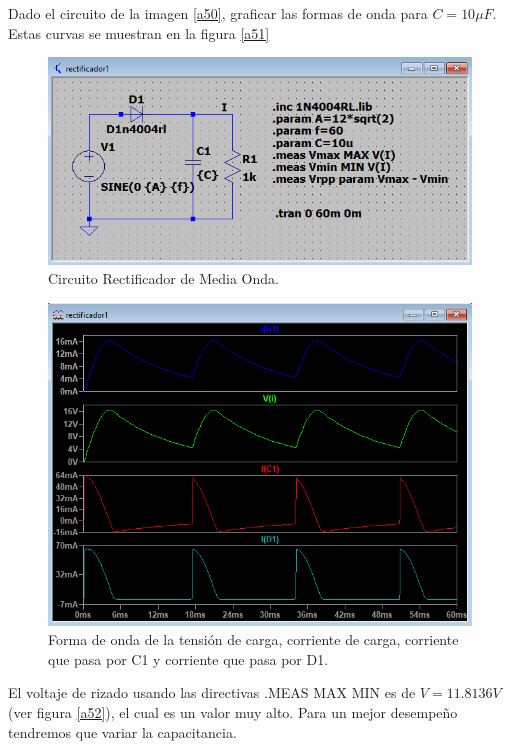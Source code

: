 \documentclass[a4paper]{IEEEtran} %
\begin{document}
Dado el circuito de la imagen \eqref{a50}, graficar las formas de onda para $C = 10\mu F$. Estas curvas se muestran en la figura \eqref{a51}

\begin{figure}[h!]
	\centering
	\includegraphics[scale=0.5]{IMAGENES/a50}
	\caption{Circuito Rectificador de Media Onda.}
	\label{a50}
\end{figure}

\begin{figure}[h!]
	\centering
	\includegraphics[scale=0.5]{IMAGENES/a51}
	\caption{Forma de onda de la tensión de carga, corriente de carga, corriente que pasa por C1 y corriente que pasa por D1.}
	\label{a51}
\end{figure}

El voltaje de rizado usando las directivas .MEAS MAX MIN es de $V=11.8136V$ (ver figura \eqref{a52}), el cual es un valor muy alto. Para un mejor desempeño tendremos que variar la capacitancia.
\end{document}
